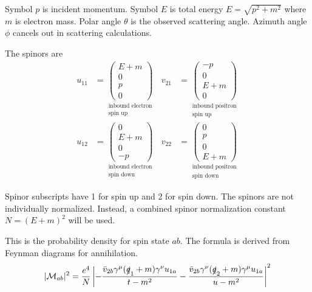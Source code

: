 \documentclass[12pt]{article}
\begin{document}
Symbol $p$ is incident momentum.
Symbol $E$ is total energy $E=\sqrt{p^2+m^2}$ where $m$ is electron mass.
Polar angle $\theta$ is the observed scattering angle.
Azimuth angle $\phi$ cancels out in scattering calculations.

\bigskip
The spinors are
\begin{align*}
u_{11}&=
\underset{\substack{\text{inbound electron}\\\text{spin up}}}
{
\begin{pmatrix}E+m\\0\\p\\0\end{pmatrix}
}
&
v_{21}&=
\underset{\substack{\text{inbound positron}\\\text{spin up}}}
{
\begin{pmatrix}-p\\0\\E+m\\0\end{pmatrix}
}
\\[1ex]
u_{12}&=
\underset{\substack{\text{inbound electron}\\\text{spin down}}}
{
\begin{pmatrix}0\\E+m\\0\\-p\end{pmatrix}
}
&
v_{22}&=
\underset{\substack{\text{inbound positron}\\\text{spin down}}}
{
\begin{pmatrix}0\\p\\0\\E+m\end{pmatrix}
}
\end{align*}

Spinor subscripts have 1 for spin up and 2 for spin down.
The spinors are not individually normalized.
Instead, a combined spinor normalization constant $N=(E+m)^2$ will be used.

\bigskip
This is the probability density for spin state $ab$.
The formula is derived from Feynman diagrams for annihilation.
\begin{equation*}
|\mathcal{M}_{ab}|^2
=
\frac{e^4}{N}
\left|
-\frac{\bar{v}_{2b}\gamma^\mu(\slashed{q}_1+m)\gamma^\nu u_{1a}}{t-m^2}
-\frac{\bar{v}_{2b}\gamma^\nu(\slashed{q}_2+m)\gamma^\mu u_{1a}}{u-m^2}
\right|^2
\end{equation*}
\end{document}
